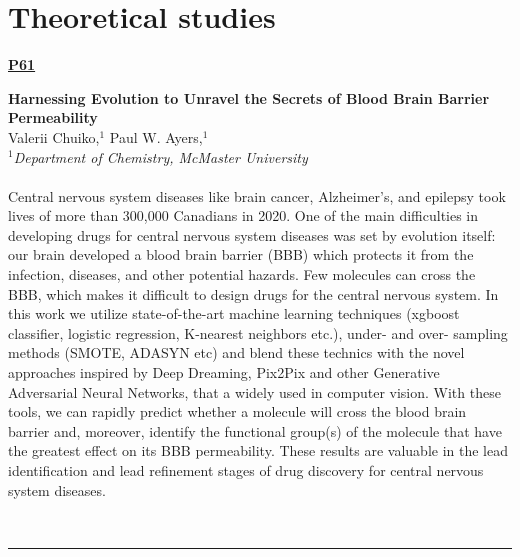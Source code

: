 \documentclass[titlepage,oneside,openany,10pt]{book}
\newenvironment{posterabs}[4] %
        {
	\begin{flushright}
                \underline{\textbf{#4}}
        \end{flushright}
        \textbf{#1}\\%
        #2\\%
        \textit{#3}\\\\%
        }
        {
        \\
        \noindent\rule{15cm}{0.5pt}%
        }
\begin{document}

\newpage

\section*{Theoretical studies}
\label{sec:theory}


\begin{posterabs}
	{Harnessing Evolution to Unravel the Secrets of Blood Brain Barrier Permeability}
	{Valerii Chuiko,$^{1}$ Paul W. Ayers,$^{1}$}
	{
	$^1$Department of Chemistry, McMaster University
	}
	{P61}
	Central nervous system diseases like brain cancer, Alzheimer's, and epilepsy took lives of more than 300,000 Canadians in 2020. One of the main difficulties in developing drugs for central nervous system diseases was set by evolution itself: our brain developed a blood brain barrier (BBB) which protects it from the infection, diseases, and other potential hazards. Few molecules can cross the BBB, which makes it difficult to design drugs for the central nervous system. In this work we utilize state-of-the-art machine learning techniques (xgboost classifier, logistic regression, K-nearest neighbors etc.), under- and over- sampling methods (SMOTE, ADASYN etc) and blend these technics with the novel approaches inspired by Deep Dreaming, Pix2Pix and other Generative Adversarial Neural Networks, that a widely used in computer vision. With these tools, we can rapidly predict whether a molecule will cross the blood brain barrier and, moreover, identify the functional group(s) of the molecule that have the greatest effect on its BBB permeability. These results are valuable in the lead identification and lead refinement stages of drug discovery for central nervous system diseases.
	\label{ChuikoV}
\end{posterabs}

\vspace{1cm}
\end{document}
